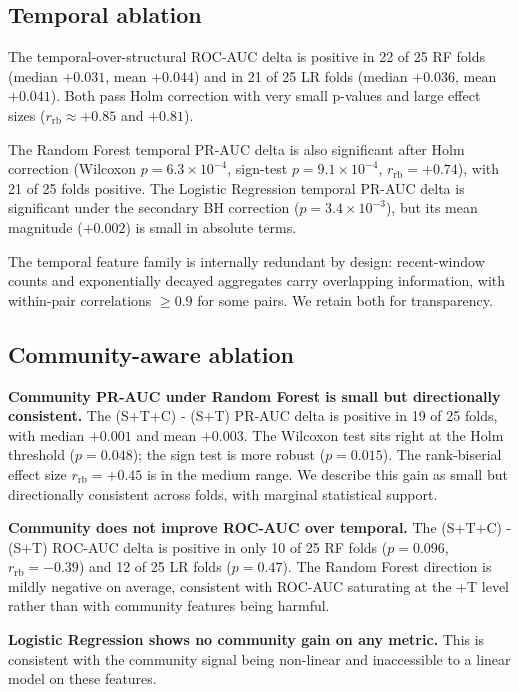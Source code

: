 \subsection{Temporal ablation}\label{sec:results:temporal}

The temporal-over-structural ROC-AUC delta is positive in 22 of 25
RF folds (median $+0.031$, mean $+0.044$) and in 21 of 25 LR folds
(median $+0.036$, mean $+0.041$). Both pass Holm correction with
very small p-values and large effect sizes
($r_{\mathrm{rb}} \approx +0.85$ and $+0.81$).

The Random Forest temporal PR-AUC delta is also significant after
Holm correction (Wilcoxon $p = 6.3\!\times\!10^{-4}$, sign-test
$p = 9.1\!\times\!10^{-4}$, $r_{\mathrm{rb}} = +0.74$), with 21 of
25 folds positive. The Logistic Regression temporal PR-AUC delta is
significant under the secondary BH correction
($p = 3.4\!\times\!10^{-3}$), but its mean magnitude ($+0.002$) is
small in absolute terms.

The temporal feature family is internally redundant by design:
recent-window counts and exponentially decayed aggregates carry
overlapping information, with within-pair correlations $\geq 0.9$
for some pairs. We retain both for transparency.

\subsection{Community-aware ablation}\label{sec:results:community}

\textbf{Community PR-AUC under Random Forest is small but
directionally consistent.} The (S+T+C) - (S+T) PR-AUC delta is
positive in 19 of 25 folds, with median $+0.001$ and mean $+0.003$.
The Wilcoxon test sits right at the Holm threshold
($p = 0.048$); the sign test is more robust ($p = 0.015$). The
rank-biserial effect size $r_{\mathrm{rb}} = +0.45$ is in the medium
range. We describe this gain as small but directionally consistent
across folds, with marginal statistical support.

\textbf{Community does not improve ROC-AUC over temporal.} The
(S+T+C) - (S+T) ROC-AUC delta is positive in only 10 of 25 RF folds
($p = 0.096$, $r_{\mathrm{rb}} = -0.39$) and 12 of 25 LR folds
($p = 0.47$). The Random Forest direction is mildly negative on
average, consistent with ROC-AUC saturating at the $+$T level rather
than with community features being harmful.

\textbf{Logistic Regression shows no community gain on any metric.}
This is consistent with the community signal being non-linear and
inaccessible to a linear model on these features.

